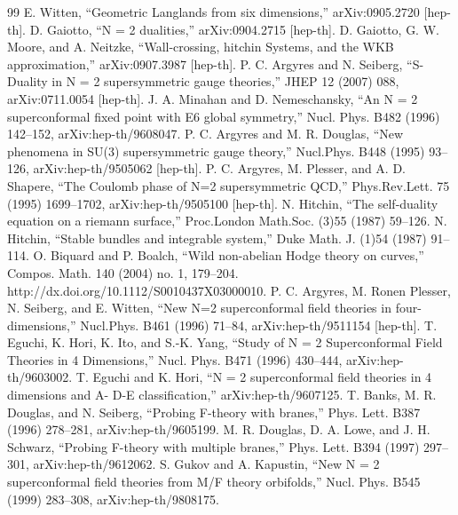 \begin{thebibliography}{99}
 E. Witten, “Geometric Langlands from six dimensions,” arXiv:0905.2720 [hep-th].
 D. Gaiotto, “N = 2 dualities,” arXiv:0904.2715 [hep-th].
 D. Gaiotto, G. W. Moore, and A. Neitzke, “Wall-crossing, hitchin Systems, and the WKB approximation,” arXiv:0907.3987 [hep-th].
 P. C. Argyres and N. Seiberg, “S-Duality in N = 2 supersymmetric gauge theories,” JHEP 12 (2007) 088, arXiv:0711.0054 [hep-th].
 J. A. Minahan and D. Nemeschansky, “An N = 2 superconformal ﬁxed point with E6 global symmetry,” Nucl. Phys. B482 (1996) 142–152, arXiv:hep-th/9608047.
 P. C. Argyres and M. R. Douglas, “New phenomena in SU(3) supersymmetric gauge theory,” Nucl.Phys. B448 (1995) 93–126, arXiv:hep-th/9505062 [hep-th].
 P. C. Argyres, M. Plesser, and A. D. Shapere, “The Coulomb phase of N=2 supersymmetric QCD,” Phys.Rev.Lett. 75 (1995) 1699–1702, arXiv:hep-th/9505100 [hep-th].
 N. Hitchin, “The self-duality equation on a riemann surface,” Proc.London Math.Soc. (3)55 (1987) 59–126.
 N. Hitchin, “Stable bundles and integrable system,” Duke Math. J. (1)54 (1987) 91–114.
 O. Biquard and P. Boalch, “Wild non-abelian Hodge theory on curves,” Compos. Math. 140 (2004) no. 1, 179–204. http://dx.doi.org/10.1112/S0010437X03000010.
 P. C. Argyres, M. Ronen Plesser, N. Seiberg, and E. Witten, “New N=2 superconformal ﬁeld theories in four-dimensions,” Nucl.Phys. B461 (1996) 71–84, arXiv:hep-th/9511154 [hep-th].
 T. Eguchi, K. Hori, K. Ito, and S.-K. Yang, “Study of N = 2 Superconformal Field Theories in 4 Dimensions,” Nucl. Phys. B471 (1996) 430–444, arXiv:hep-th/9603002.
 T. Eguchi and K. Hori, “N = 2 superconformal ﬁeld theories in 4 dimensions and A- D-E classiﬁcation,” arXiv:hep-th/9607125.
 T. Banks, M. R. Douglas, and N. Seiberg, “Probing F-theory with branes,” Phys. Lett. B387 (1996) 278–281, arXiv:hep-th/9605199.
 M. R. Douglas, D. A. Lowe, and J. H. Schwarz, “Probing F-theory with multiple branes,” Phys. Lett. B394 (1997) 297–301, arXiv:hep-th/9612062.
 S. Gukov and A. Kapustin, “New N = 2 superconformal ﬁeld theories from M/F theory orbifolds,” Nucl. Phys. B545 (1999) 283–308, arXiv:hep-th/9808175.

\end{thebibliography}
